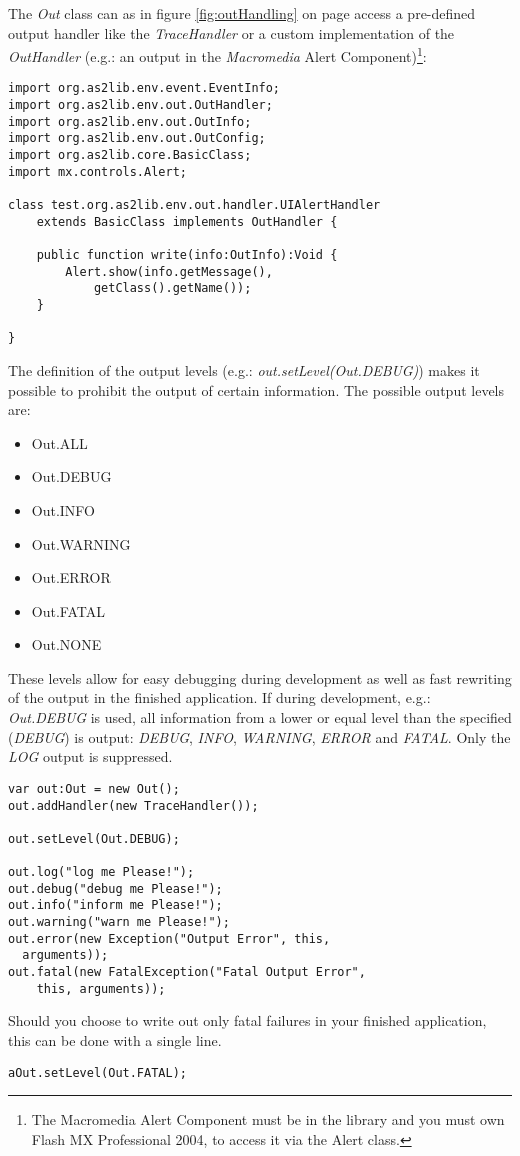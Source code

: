 The \emph{Out} class can as in figure \ref{fig:outHandling} on page \pageref{fig:outHandling} access a pre-defined output handler like the \emph{TraceHandler} or a custom implementation of the \emph{OutHandler} (e.g.: an output in the {\sl Macromedia} Alert Component)\footnote{The Macromedia Alert Component must be in the library and you must own Flash MX Professional 2004, to access it via the Alert class.}:

\begin{lstlisting}[frame=single]
import org.as2lib.env.event.EventInfo;
import org.as2lib.env.out.OutHandler;
import org.as2lib.env.out.OutInfo;
import org.as2lib.env.out.OutConfig;
import org.as2lib.core.BasicClass;
import mx.controls.Alert;

class test.org.as2lib.env.out.handler.UIAlertHandler 
	extends BasicClass implements OutHandler {

	public function write(info:OutInfo):Void {
		Alert.show(info.getMessage(), 
			getClass().getName());
	}

}
\end{lstlisting}

The definition of the output levels (e.g.: \emph{out.setLevel(Out.DEBUG)}) makes it possible to prohibit the output of certain information.
The possible output levels are:
\begin{itemize}
	\item Out.ALL
	\item Out.DEBUG
	\item Out.INFO
	\item Out.WARNING
	\item Out.ERROR
	\item Out.FATAL
	\item Out.NONE
\end{itemize}

These levels allow for easy debugging during development as well as fast rewriting of the output in the finished application.
If during development, e.g.: \emph{Out.DEBUG} is used, all information from a lower or equal level than the specified (\textit{DEBUG}) is output: \textit{DEBUG}, \textit{INFO}, \textit{WARNING}, \textit{ERROR} and \textit{FATAL}. Only the \textit{LOG} output is suppressed.
\begin{lstlisting}[frame=single]
var out:Out = new Out();
out.addHandler(new TraceHandler());

out.setLevel(Out.DEBUG);

out.log("log me Please!");
out.debug("debug me Please!");
out.info("inform me Please!");
out.warning("warn me Please!");
out.error(new Exception("Output Error", this, 
  arguments));
out.fatal(new FatalException("Fatal Output Error",
	this, arguments));
\end{lstlisting}

Should you choose to write out only fatal failures in your finished application, this can be done with a single line.

\begin{lstlisting}[frame=single]
aOut.setLevel(Out.FATAL);
\end{lstlisting}
